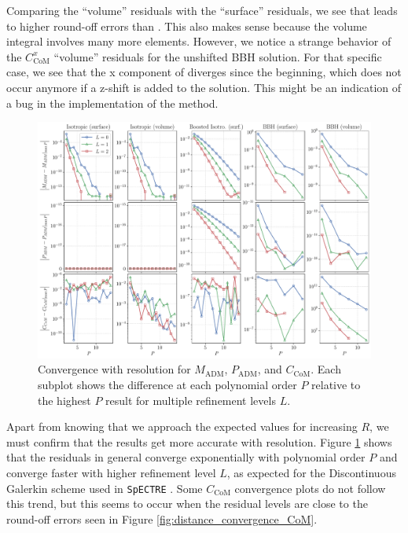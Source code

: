 \documentclass{../document}
\begin{document}
      Comparing the ``volume'' residuals with the ``surface'' residuals, we see that \eq{\eqref{eq:CoM-mixed}} leads to higher round-off errors than \eq{\eqref{eq:CoM-surf}}. This also makes sense because the volume integral involves many more elements. However, we notice a strange behavior of the $C_\text{CoM}^x$ ``volume'' residuals for the unshifted BBH solution. For that specific case, we see that the x component of \eq{\eqref{eq:CoM-mixed}} diverges since the beginning, which does not occur anymore if a z-shift is added to the solution. This might be an indication of a bug in the implementation of the method.

      \begin{figure}
        \centering
        \includegraphics[width=\textwidth]{../../plots/final_report/resolution_convergence.pdf}
        \caption{Convergence with resolution for $M_\text{ADM}$, $P_\text{ADM}$, and $C_\text{CoM}$. Each subplot shows the difference at each polynomial order $P$ relative to the highest $P$ result for multiple refinement levels $L$.}
        \label{fig:resolution_convergence}
      \end{figure}

      Apart from knowing that we approach the expected values for increasing $R$, we must confirm that the results get more accurate with resolution. Figure \ref{fig:resolution_convergence} shows that the residuals in general converge exponentially with polynomial order $P$ and converge faster with higher refinement level $L$, as expected for the Discontinuous Galerkin scheme used in {\tt SpECTRE} \cite{DGMethods}. Some $C_\text{CoM}$ convergence plots do not follow this trend, but this seems to occur when the residual levels are close to the round-off errors seen in Figure \ref{fig:distance_convergence_CoM}.
\end{document}
